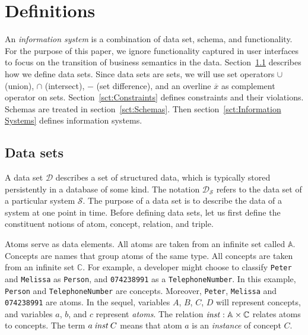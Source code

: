 \documentclass[runningheads]{llncs}
\newcommand{\id}[1]{\text{\it #1\/}}
\newcommand{\instance}{\mathbin{\id{inst}}}
\newcommand{\Pair}[2]{#1\times#2}
\newcommand{\atom}[1]{{\tt\small #1}}
\newcommand{\Atoms}{\mathbb{A}}
\newcommand{\concept}[1]{{\tt\small #1}}
\newcommand{\Concepts}{\mathbb{C}}
\newcommand{\dataset}{\mathscr{D}}
\newcommand{\infsys}{\mathscr{S}}
\newcommand{\cmpl}[1]{\overline{#1}}
\def\define#1{\label{dfn:#1}{\em #1}\index{#1}}
\begin{document}
\section{Definitions}
\label{sct:Definitions}
   An \define{information system} is a combination of data set, schema, and functionality.
   For the purpose of this paper, we ignore functionality captured in user interfaces to focus on the transition of business semantics in the data.
   Section~\ref{sct:Data sets} describes how we define data sets.
   Since data sets are sets, we will use set operators $\cup$ (union), $\cap$ (intersect), $-$ (set difference), and an overline $\cmpl{x}$ as complement operator on sets.
   Section~\ref{sct:Constraints} defines constraints and their violations.
   Schemas are treated in section~\ref{sct:Schemas}.
   Then section~\ref{sct:Information Systems} defines information systems.

\subsection{Data sets}
\label{sct:Data sets}
   A data set $\dataset$ describes a set of structured data, which is typically stored persistently in a database of some kind.
   The notation $\dataset_{\infsys}$ refers to the data set of a particular system $\infsys$.
   The purpose of a data set is to describe the data of a system at one point in time. 
   Before defining data sets, let us first define the constituent notions of atom, concept, relation, and triple.
   
   Atoms serve as data elements.
   All atoms are taken from an infinite set called $\Atoms$.
   Concepts are names that group atoms of the same type.
   All concepts are taken from an infinite set $\Concepts$.
   For example, a developer might choose to classify \atom{Peter} and \atom{Melissa} as \concept{Person},
   and \atom{074238991} as a \concept{TelephoneNumber}.
   In this example, \concept{Person} and \concept{TelephoneNumber} are concepts.
   Moreover, \atom{Peter}, \atom{Melissa} and \atom{074238991} are atoms.
   In the sequel, variables $A$, $B$, $C$, $D$ will represent concepts, and variables $a$, $b$, and $c$ represent \emph{atoms}.
   The relation $\instance:\Pair{\Atoms}{\Concepts}$ relates atoms to concepts.
   The term $a\instance C$ means that atom $a$ is an \emph{instance} of concept $C$.
\end{document}
